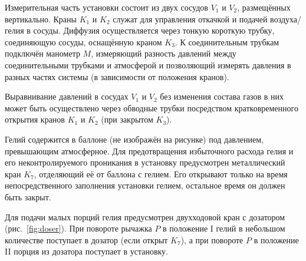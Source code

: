 \documentclass[a4paper,12pt]{article}
\begin{document}
        
        Измерительная часть установки состоит из двух сосудов $V_1$ и $V_2$, размещённых вертикально. Краны $K_1$ и $K_2$ служат для управления откачкой и подачей воздуха/гелия в сосуды. Диффузия осуществляется через тонкую короткую трубку, соединяющую сосуды, оснащённую краном $K_3$. К соединительным трубкам подключён манометр $M$, измеряющий разность давлений между соединительными трубками и атмосферой и позволяющий измерять давления в разных частях системы (в зависимости от положения кранов).
        
        Выравнивание давлений в сосудах $V_1$ и $V_2$ без изменения состава газов в них может быть осуществлено через обводные трубки посредством кратковременного открытия кранов $K_1$ и $K_2$ (при закрытом $K_3$).
        
        Гелий содержится в баллоне (не изображён на рисунке) под давлением, превышающим атмосферное. Для предотвращения избыточного расхода гелия и его неконтролируемого проникания в установку предусмотрен металлический кран $K_7$, отделяющий её от баллона с гелием. Его открывают только на время непосредственного заполнения установки гелием, остальное время он должен быть закрыт.
        
        Для подачи малых порций гелия предусмотрен двухходовой кран с дозатором (рис.~\ref{fig:doser}). При повороте рычажка $P$ в положение I гелий в небольшом количестве поступает в дозатор (если открыт $K_7$), а при повороте $P$ в положение II порция из дозатора поступает в установку.
        
\end{document}

